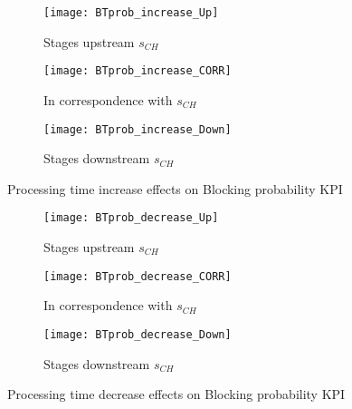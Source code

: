 \begin{landscape}
\begin{figure}[p]
  \centering
  \begin{subfigure}[t]{0.4\textwidth}
    \texttt{[image: BTprob\_increase\_Up]}
    \caption{Stages upstream $s_{CH}$}
    \label{fig:Processing time increase effects on Blocking probability KPI - Stages upstream}   
  \end{subfigure}
  \begin{subfigure}[t]{0.4\textwidth}
    \texttt{[image: BTprob\_increase\_CORR]}
    \caption{In correspondence with $s_{CH}$}
    \label{fig:Processing time increase effects on Blocking probability KPI - In correspondence with}   
  \end{subfigure}
  \begin{subfigure}[t]{0.4\textwidth}
    \texttt{[image: BTprob\_increase\_Down]}
    \caption{Stages downstream $s_{CH}$}
    \label{fig:Processing time increase effects on Blocking probability KPI - Stages downstream}   
  \end{subfigure}
  \caption{Processing time increase effects on Blocking probability KPI}
  \label{fig:Processing time increase effects on Blocking probability KPI}
\end{figure}
\begin{figure}[p]
  \centering
  \begin{subfigure}[b]{0.4\textwidth}
    \texttt{[image: BTprob\_decrease\_Up]}
    \caption{Stages upstream $s_{CH}$}
    \label{fig:Processing time decrease effects on Blocking probability KPI - Stages upstream}   
  \end{subfigure}
  \begin{subfigure}[b]{0.4\textwidth}
    \texttt{[image: BTprob\_decrease\_CORR]}
    \caption{In correspondence with $s_{CH}$}
    \label{fig:Processing time decrease effects on Blocking probability KPI - In correspondence with}   
  \end{subfigure}
  \begin{subfigure}[b]{0.4\textwidth}
    \texttt{[image: BTprob\_decrease\_Down]}
    \caption{Stages downstream $s_{CH}$}
    \label{fig:Processing time decrease effects on Blocking probability KPI - Stages downstream}   
  \end{subfigure}
  \caption{Processing time decrease effects on Blocking probability KPI}
  \label{fig:Processing time decrease effects on Blocking probability KPI}
\end{figure}
\end{landscape}
